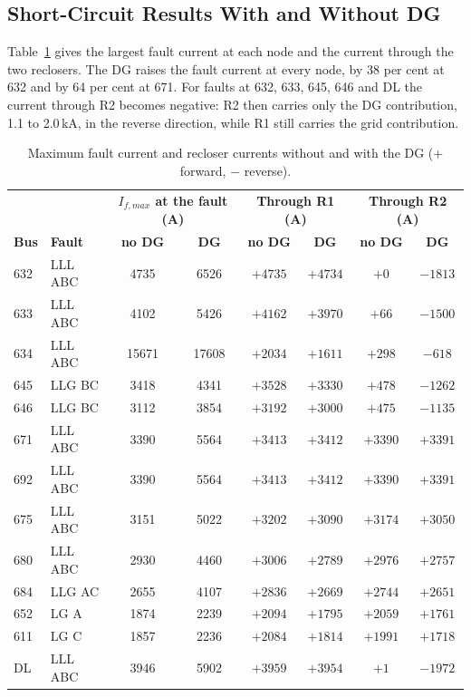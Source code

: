 \documentclass[12pt,a4paper]{article}
\begin{document}
\subsection{Short-Circuit Results With and Without DG}
Table~\ref{tab:fault} gives the largest fault current at each node and the current through the two reclosers.
The DG raises the fault current at every node, by 38 per cent at 632 and by 64 per cent at 671. For faults at 632,
633, 645, 646 and DL the current through R2 becomes negative: R2 then carries only the DG contribution, 1.1
to 2.0\,kA, in the reverse direction, while R1 still carries the grid contribution.

\begin{table}[H]
\centering\footnotesize
\begin{tabular}{|l|l|c|c|c|c|c|c|}
\hline
 & & \multicolumn{2}{c|}{\textbf{$I_{f,max}$ at the fault (A)}} & \multicolumn{2}{c|}{\textbf{Through R1 (A)}} & \multicolumn{2}{c|}{\textbf{Through R2 (A)}} \\
\textbf{Bus} & \textbf{Fault} & \textbf{no DG} & \textbf{DG} & \textbf{no DG} & \textbf{DG} & \textbf{no DG} & \textbf{DG} \\ \hline
632 & LLL ABC & 4735 & 6526 & $+4735$ & $+4734$ & $+0$ & $-1813$ \\ \hline
633 & LLL ABC & 4102 & 5426 & $+4162$ & $+3970$ & $+66$ & $-1500$ \\ \hline
634 & LLL ABC & 15671 & 17608 & $+2034$ & $+1611$ & $+298$ & $-618$ \\ \hline
645 & LLG BC & 3418 & 4341 & $+3528$ & $+3330$ & $+478$ & $-1262$ \\ \hline
646 & LLG BC & 3112 & 3854 & $+3192$ & $+3000$ & $+475$ & $-1135$ \\ \hline
671 & LLL ABC & 3390 & 5564 & $+3413$ & $+3412$ & $+3390$ & $+3391$ \\ \hline
692 & LLL ABC & 3390 & 5564 & $+3413$ & $+3412$ & $+3390$ & $+3391$ \\ \hline
675 & LLL ABC & 3151 & 5022 & $+3202$ & $+3090$ & $+3174$ & $+3050$ \\ \hline
680 & LLL ABC & 2930 & 4460 & $+3006$ & $+2789$ & $+2976$ & $+2757$ \\ \hline
684 & LLG AC & 2655 & 4107 & $+2836$ & $+2669$ & $+2744$ & $+2651$ \\ \hline
652 & LG A & 1874 & 2239 & $+2094$ & $+1795$ & $+2059$ & $+1761$ \\ \hline
611 & LG C & 1857 & 2236 & $+2084$ & $+1814$ & $+1991$ & $+1718$ \\ \hline
DL & LLL ABC & 3946 & 5902 & $+3959$ & $+3954$ & $+1$ & $-1972$ \\ \hline
\end{tabular}
\caption{Maximum fault current and recloser currents without and with the DG (+ forward, $-$ reverse).}
\label{tab:fault}
\end{table}
\end{document}
